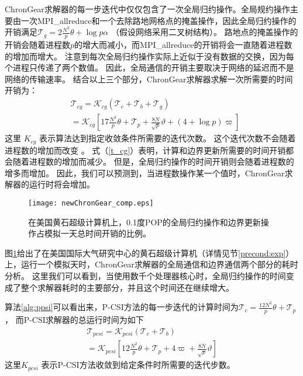  
ChronGear求解器的每一步迭代中仅仅包含了一次全局归约操作。全局规约操作主要由一次MPI\_allreduce和一个去除路地网格点的掩盖操作，因此全局归约操作的开销满足$\mathcal{T}_g= 2\frac{N^2}{p}\theta + \log p \alpha$ （假设网络采用二叉树结构）。 
路地点的掩盖操作的开销会随着进程数$p$的增大而减小，而MPI\_allreduce的开销将会一直随着进程数的增加而增大。 
注意到每次全局归约操作实际上近似于没有数据的交换，因为每个进程只传递了两个数值。
因此，全局通信的开销主要取决于网络的延迟而不是网络的传输速率。
结合以上三个部分，ChronGear求解器求解一次所需要的时间开销为：
\begin{eqnarray}
\label{t_cg}
&\mathcal{T}_{cg}=\mathcal{K}_{cg} (\mathcal{T}_c + \mathcal{T}_b+\mathcal{T}_g )\nonumber \\
&=\mathcal{K}_{cg} [17 \frac{N^2}{p}\theta + \mathcal{T}_{p} +\frac{8N}{\sqrt{p}}\vartheta +(4+\log p)\varpi]
\end{eqnarray}
这里 $K_{cg}$ 表示算法达到指定收敛条件所需要的迭代次数。
这个迭代次数不会随着进程数的增加而改变 \cite{hu2013scalable}。 
式（\ref{t_cg}）表明，计算和边界更新所需要的时间开销都会随着进程数的增加而减少。 
但是，全局归约操作的时间开销则会随着进程数的增多而增加。 
因此，我们可以预测到，当进程数操作某一个值时，ChronGear求解器的运行时将会增加。 

\begin{figure}[!t]
\begin{center}
	\texttt{[image: newChronGear\_comp.eps]}
\caption[] {在美国黄石超级计算机上，0.1度POP的全局归约操作和边界更新操作占模拟一天总时间开销的比例。}
\label{fig:ChronGearCOMP}
\end{center}
\end{figure}
 
图\ref{fig:ChronGearCOMP}给出了在美国国际大气研究中心的黄石超级计算机（详情见节\ref{precond:exp}）上，运行一个模拟天时，ChronGear求解器的全局通信和边界通信两个部分的耗时分析。 
这里我们可以看到，当使用数千个处理器核心时，全局归约操作的时间变成了整个求解器耗时的主要部分，并且这个时间还在继续增大。



算法\ref{alg:ppsi}可以看出来，P-CSI方法的每一步迭代的计算时间为$\mathcal{T}_c =\frac{12N^2}{p}\theta+\mathcal{T}_p$， 
而P-CSI求解器的总运行时间为如下
\begin{eqnarray}
\label{t_psi}
\mathcal{T}_{pcsi} = \mathcal{K}_{pcsi}(\mathcal{T}_c + \mathcal{T}_b ) \nonumber \\
= \mathcal{K}_{pcsi}[12\frac{N^2}{p}\theta+ \mathcal{T}_p +4\varpi + \frac{8N}{ \sqrt{p}}\vartheta]
\end{eqnarray}
这里$K_{pcsi}$ 表示P-CSI方法收敛到给定条件时所需要的迭代步数。 



